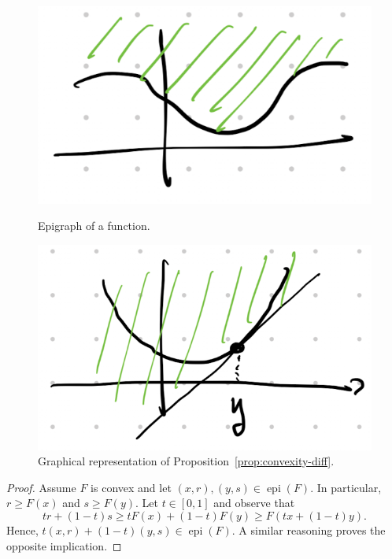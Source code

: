 \documentclass{report}
\begin{document}

	\begin{figure}
		\begin{minipage}{.48\textwidth}
			\centering
			\includegraphics[width=.6\textwidth]{images/epigraph.png}
			\caption{Epigraph of a function.}
		\end{minipage}
		\begin{minipage}{.48\textwidth}
			\centering
			\includegraphics[width=.6\textwidth]{images/convexity-diff.png}
			\caption{Graphical representation of Proposition~\ref{prop:convexity-diff}.}
		\end{minipage}
	\end{figure}

	\begin{proof}
		Assume $F$ is convex and let $(x,r),(y,s)\in\operatorname{epi}(F)$. 
		In particular, $r\ge F(x)$ and $s\ge F(y)$.
		Let $t\in [0,1]$ and observe that
		\begin{equation}
			t r +(1-t)s \ge t F(x)+(1-t)F(y) \ge  F(tx+(1-t)y).
		\end{equation}
		Hence, $t(x,r) + (1-t)(y,s)\in\operatorname{epi}(F)$. A similar reasoning proves the opposite implication.
	\end{proof}	
\end{document}
